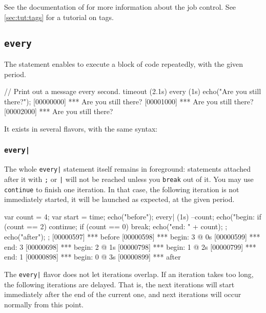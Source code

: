 See the documentation of  for more information about the job
control.  See \autoref{sec:tut:tags} for a tutorial on tags.

\subsection{\lstinline{every}}
\label{sec:lang:every}
The  statement enables to execute a block of code
repeatedly, with the given period.

\begin{urbiscript}
// Print out a message every second.
timeout (2.1s)
  every (1s)
    echo("Are you still there?");
[00000000] *** Are you still there?
[00001000] *** Are you still there?
[00002000] *** Are you still there?
\end{urbiscript}

It exists in several flavors, with the same syntax:


\subsubsection{\lstinline{every|}}
The whole \lstinline'every|' statement itself remains in foreground:
statements attached after it with \lstinline';' or \lstinline'|' will
not be reached unless you \lstinline{break} out of it.  You may use
\lstinline{continue} to finish one iteration.  In that case, the
following iteration is not immediately started, it will be launched as
expected, at the given period.

\begin{urbiscript}
{
  var count = 4;
  var start = time;
  echo("before");
  every| (1s)
  {
    --count;
    echo("begin: %
    if (count == 2)
      continue;
    if (count == 0)
      break;
    echo("end:   " + count);
  };
  echo("after");
};
[00000597] *** before
[00000598] *** begin: 3 @ 0s
[00000599] *** end:   3
[00000698] *** begin: 2 @ 1s
[00000798] *** begin: 1 @ 2s
[00000799] *** end:   1
[00000898] *** begin: 0 @ 3s
[00000899] *** after
\end{urbiscript}

The \lstinline{every|} flavor does not let iterations overlap. If an
iteration takes too long, the following iterations are delayed. That
is, the next iterations will start immediately after the end of the
current one, and next iterations will occur normally from this point.

